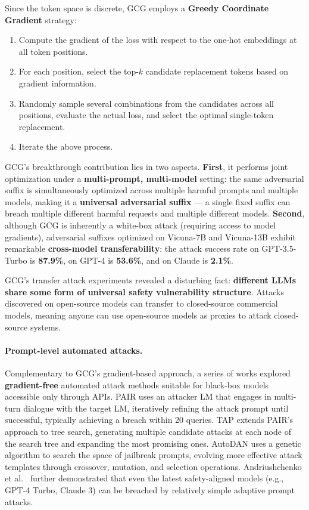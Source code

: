 Since the token space is discrete, GCG employs a \textbf{Greedy Coordinate Gradient} strategy:
\begin{enumerate}[leftmargin=2em]
  \item Compute the gradient of the loss with respect to the one-hot embeddings at all token positions.
  \item For each position, select the top-$k$ candidate replacement tokens based on gradient information.
  \item Randomly sample several combinations from the candidates across all positions,
    evaluate the actual loss, and select the optimal single-token replacement.
  \item Iterate the above process.
\end{enumerate}

GCG's breakthrough contribution lies in two aspects.
\textbf{First}, it performs joint optimization under a \textbf{multi-prompt, multi-model} setting:
the same adversarial suffix is simultaneously optimized across multiple harmful prompts and multiple models,
making it a \textbf{universal adversarial suffix} ---
a single fixed suffix can breach multiple different harmful requests and multiple different models.
\textbf{Second}, although GCG is inherently a white-box attack (requiring access to model gradients),
adversarial suffixes optimized on Vicuna-7B and Vicuna-13B exhibit remarkable
\textbf{cross-model transferability}:
the attack success rate on GPT-3.5-Turbo is \textbf{87.9\%},
on GPT-4 is \textbf{53.6\%},
and on Claude is \textbf{2.1\%}.

\begin{problembox}
GCG's transfer attack experiments revealed a disturbing fact:
\textbf{different LLMs share some form of universal safety vulnerability structure}.
Attacks discovered on open-source models can transfer to closed-source commercial models,
meaning anyone can use open-source models as proxies to attack closed-source systems.
\end{problembox}

\paragraph{Prompt-level automated attacks.}
Complementary to GCG's gradient-based approach, a series of works explored \textbf{gradient-free} automated attack methods
suitable for black-box models accessible only through APIs.
PAIR \cite{chao2023pair} uses an attacker LM that engages in multi-turn dialogue with the target LM,
iteratively refining the attack prompt until successful, typically achieving a breach within 20 queries.
TAP \cite{mehrotra2023tap} extends PAIR's approach to tree search,
generating multiple candidate attacks at each node of the search tree and expanding the most promising ones.
AutoDAN \cite{liu2023autodan} uses a genetic algorithm
to search the space of jailbreak prompts,
evolving more effective attack templates through crossover, mutation, and selection operations.
Andriushchenko et al.\ \cite{andriushchenko2024adaptive} further demonstrated that
even the latest safety-aligned models (e.g., GPT-4 Turbo, Claude 3)
can be breached by relatively simple adaptive prompt attacks.

